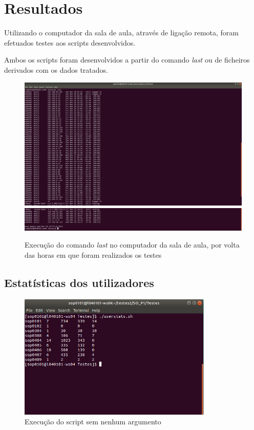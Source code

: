\documentclass[10pt,portuguese]{article}
\begin{document}
\section{Resultados}
\par Utilizando o computador da sala de aula, através de ligação remota, foram efetuados testes aos scripts desenvolvidos.
\par Ambos os scripts foram desenvolvidos a partir do comando \textit{last} ou de ficheiros derivados com os dados tratados.
\begin{figure}[!h]
    \centering
    \includegraphics[width=\textwidth]{Resultados/last_1.jpeg}
    \centering
    \includegraphics[width=\textwidth]{Resultados/last_2.jpeg}
    \caption{Execução do comando \textit{last} no computador da sala de aula, por volta das horas em que foram realizados os testes}
\end{figure}
\clearpage
\subsection{Estatísticas dos utilizadores}
\begin{figure}[!h]
    \centering
    \includegraphics[width=350]{Resultados/normal.jpeg}
    \caption{Execução do script sem nenhum argumento}
\end{figure}
\end{document}
